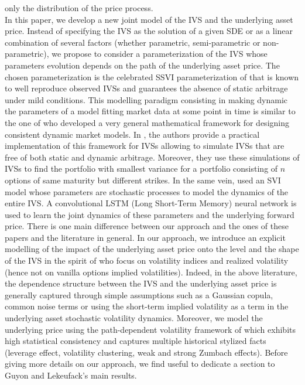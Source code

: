 only the distribution of the price process.  \\

In this paper, we develop a new joint model of the IVS and the underlying asset price. Instead of specifying the IVS as the solution of a given SDE or as a linear combination of several factors (whether parametric, semi-parametric or non-parametric), we propose to consider a parameterization of the IVS whose parameters evolution depends on the path of the underlying asset price. The chosen parameterization is the celebrated SSVI parameterization of \cite{gatheral2014arbitrage} that is known to well reproduce observed IVSs and guarantees the absence of static arbitrage under mild conditions. This modelling paradigm consisting in making dynamic the parameters of a model fitting market data at some point in time is similar to the one of \cite{carmon2011tangent} who developed a very general mathematical framework for designing consistent dynamic market models. In \cite{carmona2017levy}, the authors provide a practical implementation of this framework for IVSs allowing to simulate IVSs that are free of both static and dynamic arbitrage. Moreover, they use these simulations of IVSs to find the portfolio with smallest variance for a portfolio consisting of $n$ options of same maturity but different strikes. In the same vein, \cite{bloch2021deep} used an SVI model whose parameters are stochastic processes to model the dynamics of the entire IVS. A convolutional LSTM (Long Short-Term Memory) neural network is used to learn the joint dynamics of these parameters and the underlying forward price. There is one main difference between our approach and the ones of these papers and the literature in general. In our approach, we introduce an explicit modelling of the impact of the underlying asset price onto the level and the shape of the IVS in the spirit of \cite{guyon2022volatility} who focus on volatility indices and realized volatility (hence not on vanilla options implied volatilities). Indeed, in the above literature, the dependence structure between the IVS and the underlying asset price is generally captured through simple assumptions such as a Gaussian copula, common noise terms or using the short-term implied volatility as a term in the underlying asset stochastic volatility dynamics. Moreover, we model the underlying price using the path-dependent volatility framework of \cite{guyon2022volatility} which exhibits high statistical consistency and captures multiple historical stylized facts (leverage effect, volatility clustering, weak and strong Zumbach effects). Before giving more details on our approach, we find useful to dedicate a section to Guyon and Lekeufack's main results.


